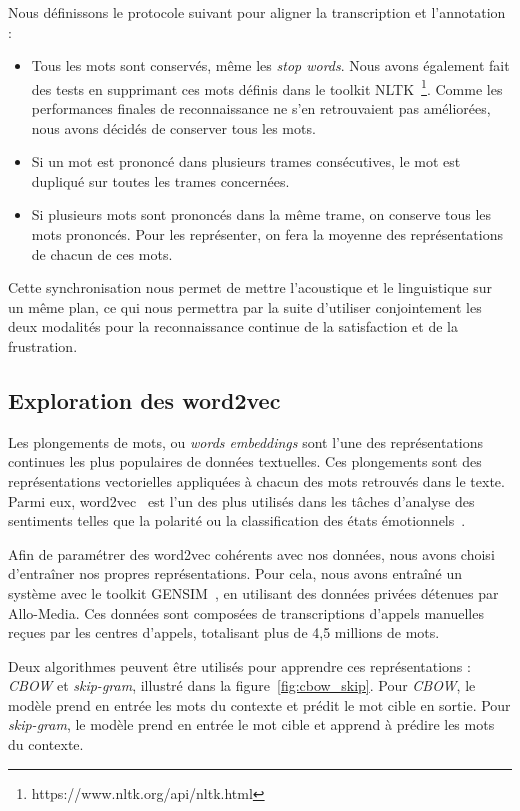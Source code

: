 Nous définissons le protocole suivant pour aligner la transcription et l'annotation :
\begin{itemize}
  \item Tous les mots sont conservés, même les \textit{stop words}. Nous avons également fait des tests en supprimant ces mots définis dans le toolkit NLTK~\footnote{https://www.nltk.org/api/nltk.html}. Comme les performances finales de reconnaissance ne s'en retrouvaient pas améliorées, nous avons décidés de conserver tous les mots.
  \item Si un mot est prononcé dans plusieurs trames consécutives, le mot est dupliqué sur toutes les trames concernées.
  \item Si plusieurs mots sont prononcés dans la même trame, on conserve tous les mots prononcés. Pour les représenter, on fera la moyenne des représentations de chacun de ces mots.
\end{itemize}

Cette synchronisation nous permet de mettre l'acoustique et le linguistique sur un même plan, ce qui nous permettra par la suite d'utiliser conjointement les deux modalités pour la reconnaissance continue de la satisfaction et de la frustration.

\subsection{Exploration des word2vec}
Les plongements de mots, ou \textit{words embeddings} sont l'une des représentations continues les plus populaires de données textuelles. Ces plongements sont des représentations vectorielles appliquées à chacun des mots retrouvés dans le texte.
Parmi eux, word2vec~\cite{word2vec} est l'un des plus utilisés dans les tâches d'analyse des sentiments telles que la polarité ou la classification des états émotionnels~\cite{Dong2018}.

Afin de paramétrer des word2vec cohérents avec nos données, nous avons choisi d’entraîner nos propres représentations. Pour cela, nous avons entraîné un système avec le toolkit GENSIM~\cite{gensim}, en utilisant des données privées détenues par Allo-Media. Ces données sont composées de transcriptions d'appels manuelles reçues par les centres d'appels, totalisant plus de 4,5 millions de mots.

Deux algorithmes peuvent être utilisés pour apprendre ces représentations : \textit{CBOW} et \textit{skip-gram}, illustré dans la figure~\ref{fig:cbow_skip}. Pour \textit{CBOW}, le modèle prend en entrée les mots du contexte et prédit le mot cible en sortie. Pour \textit{skip-gram}, le modèle prend en entrée le mot cible et apprend à prédire les mots du contexte.

